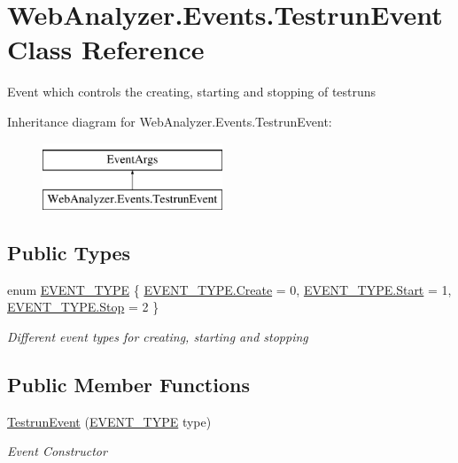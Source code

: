 \hypertarget{class_web_analyzer_1_1_events_1_1_testrun_event}{}\section{Web\+Analyzer.\+Events.\+Testrun\+Event Class Reference}
\label{class_web_analyzer_1_1_events_1_1_testrun_event}


Event which controls the creating, starting and stopping of testruns  


Inheritance diagram for Web\+Analyzer.\+Events.\+Testrun\+Event\+:\begin{figure}[H]
\begin{center}
\leavevmode
\includegraphics[height=2.000000cm]{class_web_analyzer_1_1_events_1_1_testrun_event}
\end{center}
\end{figure}
\subsection*{Public Types}
\begin{DoxyCompactItemize}
\item 
enum \hyperlink{class_web_analyzer_1_1_events_1_1_testrun_event_a97dd88675eb3148f11919cc7e40d1850}{E\+V\+E\+N\+T\+\_\+\+T\+Y\+P\+E} \{ \hyperlink{class_web_analyzer_1_1_events_1_1_testrun_event_a97dd88675eb3148f11919cc7e40d1850a686e697538050e4664636337cc3b834f}{E\+V\+E\+N\+T\+\_\+\+T\+Y\+P\+E.\+Create} = 0, 
\hyperlink{class_web_analyzer_1_1_events_1_1_testrun_event_a97dd88675eb3148f11919cc7e40d1850aa6122a65eaa676f700ae68d393054a37}{E\+V\+E\+N\+T\+\_\+\+T\+Y\+P\+E.\+Start} = 1, 
\hyperlink{class_web_analyzer_1_1_events_1_1_testrun_event_a97dd88675eb3148f11919cc7e40d1850a11a755d598c0c417f9a36758c3da7481}{E\+V\+E\+N\+T\+\_\+\+T\+Y\+P\+E.\+Stop} = 2
 \}\begin{DoxyCompactList}\small\item\em Different event types for creating, starting and stopping \end{DoxyCompactList}
\end{DoxyCompactItemize}
\subsection*{Public Member Functions}
\begin{DoxyCompactItemize}
\item 
\hyperlink{class_web_analyzer_1_1_events_1_1_testrun_event_a66e25aff631fec6d5d60e5e20a5bf94a}{Testrun\+Event} (\hyperlink{class_web_analyzer_1_1_events_1_1_testrun_event_a97dd88675eb3148f11919cc7e40d1850}{E\+V\+E\+N\+T\+\_\+\+T\+Y\+P\+E} type)
\begin{DoxyCompactList}\small\item\em Event Constructor \end{DoxyCompactList}\end{DoxyCompactItemize}
